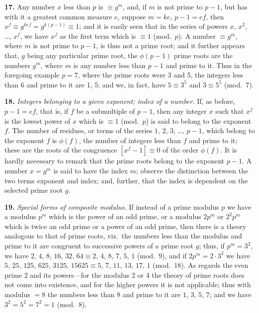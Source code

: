 \documentclass[11pt,a4paper]{book}
\begin{document}
\textbf{17.}\quad
Any number $x$ less than $p$ is $\equiv g^{m}$, and, if $m$ is not prime to $p - 1$, but has with it a greatest common measure $e$, suppose $m = ke$, $p - 1 = ef$, then $x^{f} \equiv g^{kef} = g^{k(p-1)} \equiv 1$; and it is easily seen that in the series of powers $x$, $x^{2}$, \ldots, $x^{f}$, we have $x^{f}$ as the first term which is $\equiv 1$ (mod.\ $p$). A number $\equiv g^{m}$, where $m$ is not prime to $p - 1$, is thus not a prime root; and it further appears that, $g$ being any particular prime root, the $\phi(p - 1)$ prime roots are the numbers $g^{m}$, where $m$ is any number less than $p - 1$ and prime to it. Thus in the foregoing example $p = 7$, where the prime roots were 3 and 5, the integers less than 6 and prime to it are 1, 5; and we, in fact, have $5 \equiv 3^{5}$ and $3 \equiv 5^{5}$ (mod.\ $7$).

\textbf{18.}\quad
\textit{Integers belonging to a given exponent; index of a number.} If, as before, $p - 1 = ef$, that is, if $f$ be a submultiple of $p - 1$, then any integer $x$ such that $x^{f}$ is the lowest power of $x$ which is $\equiv 1$ (mod.\ $p$) is said to belong to the exponent $f$. The number of residues, or terms of the series $1$, $2$, $3$, \ldots, $p - 1$, which belong to the exponent $f$ is $\phi(f)$, the number of integers less than $f$ and prime to it; these are the roots of the congruence $[x^{f} - 1] \equiv 0$ of the order $\phi(f)$. It is hardly necessary to remark that the prime roots belong to the exponent $p - 1$. A number $x = g^{m}$ is said to have the index $m$; observe the distinction between the two terms exponent and index; and, further, that the index is dependent on the selected prime root $g$.

\textbf{19.}\quad
\textit{Special forms of composite modulus.} If instead of a prime modulus $p$ we have a modulus $p^{m}$ which is the power of an odd prime, or a modulus $2p^{m}$ or $2^{2}p^{m}$ which is twice an odd prime or a power of an odd prime, then there is a theory analogous to that of prime roots, viz.\ the numbers less than the modulus and prime to it are congruent to successive powers of a prime root $g$; thus, if $p^{m} = 3^{2}$, we have $2$, $4$, $8$, $16$, $32$, $64 \equiv 2$, $4$, $8$, $7$, $5$, $1$ (mod.\ $9$), and if $2p^{m} = 2 \cdot 3^{2}$ we have $5$, $25$, $125$, $625$, $3125$, $15625 \equiv 5$, $7$, $11$, $13$, $17$, $1$ (mod.\ $18$). As regards the even prime 2 and its powers---for the modulus 2 or 4 the theory of prime roots does not come into existence, and for the higher powers it is not applicable; thus with modulus $= 8$ the numbers less than 8 and prime to it are $1$, $3$, $5$, $7$; and we have $3^{2} = 5^{2} = 7^{2} = 1$ (mod.\ $8$).
\end{document}
